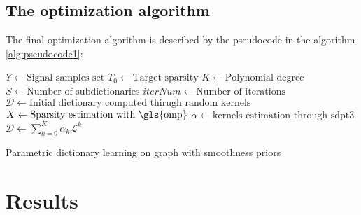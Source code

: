 \subsection{The optimization algorithm}
The final optimization algorithm is described by the pseudocode in the algorithm \ref{alg:pseudocode1}:
\begin{algorithm}[b]
  \begin{algorithmic}[1]
      \State $Y \gets \text{Signal samples set}$
      \State $T_0\gets \text{Target sparsity}$
      \State $K \gets \text{Polynomial degree}$
      \State $S \gets \text{Number of subdictionaries}$
      \State $iterNum \gets \text{Number of iterations}$
      \State $\mathcal{D} \gets \text{Initial dictionary computed thirugh random kernels}$
    \EndProcedure
        \State {}
        \State $X \gets \text{Sparsity estimation with \gls{omp}}$
      \EndProcedure
        $\alpha \gets \text{kernels estimation through sdpt3}$
      \EndProcedure
        \State $\mathcal{D} \gets \sum_{k=0}^K \alpha_k \mathcal{L}^k$
      \EndProcedure
    \EndFor
  \end{algorithmic}
  \caption{Parametric dictionary learning on graph with smoothness priors}
  \label{alg:pseudocode1}
\end{algorithm}

\section{Results}
\label{sec:dataGen}
